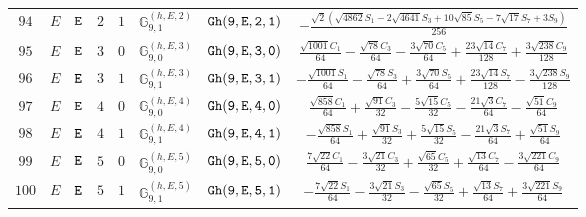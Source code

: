 \documentclass[fleqn,8pt]{jsarticle}
\begin{document}
\begin{table}[ht!]
\begin{center}
\begin{tabular}{cccccccc}
$ 94 $ & $ E $ & $ {\tt E} $ & $ 2 $ & $ 1 $ & $ \mathbb{G}_{9,1}^{(h,E,2)} $ & $ {\tt Gh(9,E,2,1)} $ & $ - \frac{\sqrt{2} \left(\sqrt{4862} S_{1} - 2 \sqrt{4641} S_{3} + 10 \sqrt{85} S_{5} - 7 \sqrt{17} S_{7} + 3 S_{9}\right)}{256} $ \\
$ 95 $ & $ E $ & $ {\tt E} $ & $ 3 $ & $ 0 $ & $ \mathbb{G}_{9,0}^{(h,E,3)} $ & $ {\tt Gh(9,E,3,0)} $ & $ \frac{\sqrt{1001} C_{1}}{64} - \frac{\sqrt{78} C_{3}}{64} - \frac{3 \sqrt{70} C_{5}}{64} + \frac{23 \sqrt{14} C_{7}}{128} + \frac{3 \sqrt{238} C_{9}}{128} $ \\
$ 96 $ & $ E $ & $ {\tt E} $ & $ 3 $ & $ 1 $ & $ \mathbb{G}_{9,1}^{(h,E,3)} $ & $ {\tt Gh(9,E,3,1)} $ & $ - \frac{\sqrt{1001} S_{1}}{64} - \frac{\sqrt{78} S_{3}}{64} + \frac{3 \sqrt{70} S_{5}}{64} + \frac{23 \sqrt{14} S_{7}}{128} - \frac{3 \sqrt{238} S_{9}}{128} $ \\
$ 97 $ & $ E $ & $ {\tt E} $ & $ 4 $ & $ 0 $ & $ \mathbb{G}_{9,0}^{(h,E,4)} $ & $ {\tt Gh(9,E,4,0)} $ & $ \frac{\sqrt{858} C_{1}}{64} + \frac{\sqrt{91} C_{3}}{32} - \frac{5 \sqrt{15} C_{5}}{32} - \frac{21 \sqrt{3} C_{7}}{64} - \frac{\sqrt{51} C_{9}}{64} $ \\
$ 98 $ & $ E $ & $ {\tt E} $ & $ 4 $ & $ 1 $ & $ \mathbb{G}_{9,1}^{(h,E,4)} $ & $ {\tt Gh(9,E,4,1)} $ & $ - \frac{\sqrt{858} S_{1}}{64} + \frac{\sqrt{91} S_{3}}{32} + \frac{5 \sqrt{15} S_{5}}{32} - \frac{21 \sqrt{3} S_{7}}{64} + \frac{\sqrt{51} S_{9}}{64} $ \\
$ 99 $ & $ E $ & $ {\tt E} $ & $ 5 $ & $ 0 $ & $ \mathbb{G}_{9,0}^{(h,E,5)} $ & $ {\tt Gh(9,E,5,0)} $ & $ \frac{7 \sqrt{22} C_{1}}{64} - \frac{3 \sqrt{21} C_{3}}{32} + \frac{\sqrt{65} C_{5}}{32} + \frac{\sqrt{13} C_{7}}{64} - \frac{3 \sqrt{221} C_{9}}{64} $ \\
$ 100 $ & $ E $ & $ {\tt E} $ & $ 5 $ & $ 1 $ & $ \mathbb{G}_{9,1}^{(h,E,5)} $ & $ {\tt Gh(9,E,5,1)} $ & $ - \frac{7 \sqrt{22} S_{1}}{64} - \frac{3 \sqrt{21} S_{3}}{32} - \frac{\sqrt{65} S_{5}}{32} + \frac{\sqrt{13} S_{7}}{64} + \frac{3 \sqrt{221} S_{9}}{64} $ \\
 \hline \hline
\end{tabular}
\end{center}
\end{table}
\end{document}
